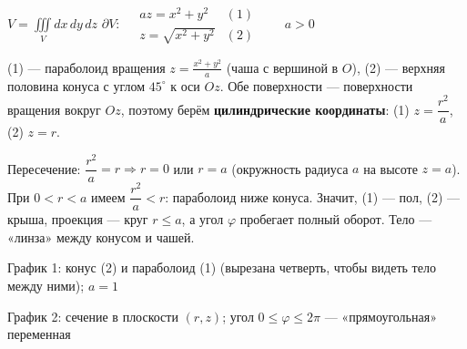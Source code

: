 

\begin{shapka}
$\displaystyle V=\iiint\limits_{V}dx\,dy\,dz$
\tcblower
$\partial V:\quad
\begin{array}{ll}
az=x^2+y^2 & (1)\\
z=\sqrt{x^2+y^2} & (2)
\end{array}\qquad a>0$
\end{shapka}

(1) --- параболоид вращения $z=\frac{x^2+y^2}{a}$ (чаша с вершиной в $O$), (2) --- верхняя половина конуса с углом $45^\circ$ к оси $Oz$. Обе поверхности --- поверхности вращения вокруг $Oz$, поэтому берём \textbf{цилиндрические координаты}: (1) $z=\dfrac{r^2}{a}$, (2) $z=r$.

Пересечение: $\dfrac{r^2}{a}=r\Rightarrow r=0$ или $r=a$ (окружность радиуса $a$ на высоте $z=a$). При $0<r<a$ имеем $\dfrac{r^2}{a}<r$: параболоид ниже конуса. Значит, (1) --- пол, (2) --- крыша, проекция --- круг $r\leqslant a$, а угол $\varphi$ пробегает полный оборот. Тело --- «линза» между конусом и чашей.

\begin{center}
\begin{minipage}[t]{0.49\linewidth}\centering
\figEleven

\small График 1: конус (2) и параболоид (1) (вырезана четверть, чтобы видеть тело между ними); $a=1$
\end{minipage}\hfill
\begin{minipage}[t]{0.49\linewidth}\centering
{}

\small График 2: сечение в плоскости $(r,z)$; угол $0\leqslant\varphi\leqslant2\pi$ --- «прямоугольная» переменная
\end{minipage}
\end{center}

